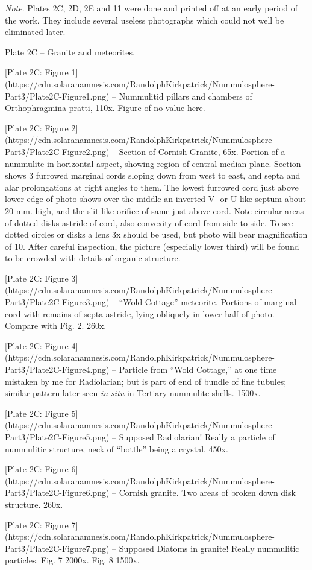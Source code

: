 \documentclass[a4paper, 12pt, oneside]{article}
\begin{document}
\emph{Note}. Plates 2C, 2D, 2E and 11 were done and printed off at an early period of the work. They include several useless photographs which could not well be eliminated later.

Plate 2C -- Granite and meteorites.

[Plate 2C: Figure 1](https://cdn.solaranamnesis.com/RandolphKirkpatrick/Nummulosphere-Part3/Plate2C-Figure1.png) -- Nummulitid pillars and chambers of Orthophragmina pratti, 110x. Figure of no value here.

[Plate 2C: Figure 2](https://cdn.solaranamnesis.com/RandolphKirkpatrick/Nummulosphere-Part3/Plate2C-Figure2.png) -- Section of Cornish Granite, 65x. Portion of a nummulite in horizontal aspect, showing region of central median plane. Section shows 3 furrowed marginal cords sloping down from west to east, and septa and alar prolongations at right angles to them. The lowest furrowed cord just above lower edge of photo shows over the middle an inverted V- or U-like septum about 20 mm. high, and the slit-like orifice of same just above cord. Note circular areas of dotted disks astride of cord, also convexity of cord from side to side. To see dotted circles or disks a lens 3x should be used, but photo will bear magnification of 10. After careful inspection, the picture (especially lower third) will be found to be crowded with details of organic structure.

[Plate 2C: Figure 3](https://cdn.solaranamnesis.com/RandolphKirkpatrick/Nummulosphere-Part3/Plate2C-Figure3.png) -- ``Wold Cottage'' meteorite. Portions of marginal cord with remains of septa astride, lying obliquely in lower half of photo. Compare with Fig. 2. 260x.

[Plate 2C: Figure 4](https://cdn.solaranamnesis.com/RandolphKirkpatrick/Nummulosphere-Part3/Plate2C-Figure4.png) -- Particle from ``Wold Cottage,'' at one time mistaken by me for Radiolarian; but is part of end of bundle of fine tubules; similar pattern later seen \emph{in situ} in Tertiary nummulite shells. 1500x.

[Plate 2C: Figure 5](https://cdn.solaranamnesis.com/RandolphKirkpatrick/Nummulosphere-Part3/Plate2C-Figure5.png) -- Supposed Radiolarian! Really a particle of nummulitic structure, neck of ``bottle'' being a crystal. 450x.

[Plate 2C: Figure 6](https://cdn.solaranamnesis.com/RandolphKirkpatrick/Nummulosphere-Part3/Plate2C-Figure6.png) -- Cornish granite. Two areas of broken down disk structure. 260x.

[Plate 2C: Figure 7](https://cdn.solaranamnesis.com/RandolphKirkpatrick/Nummulosphere-Part3/Plate2C-Figure7.png) -- Supposed Diatoms in granite! Really nummulitic particles. Fig. 7 2000x. Fig. 8 1500x.
\end{document}
